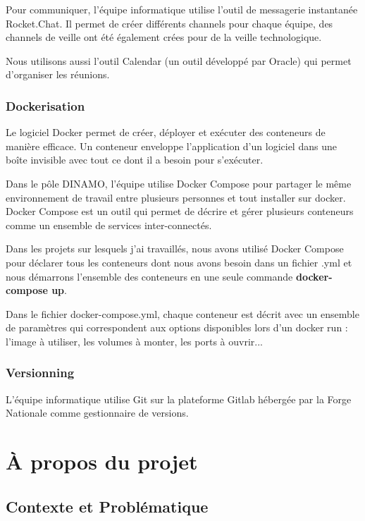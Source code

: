 \documentclass[12pt]{article}
\begin{document}
Pour communiquer, l'équipe informatique utilise l'outil de messagerie instantanée Rocket.Chat. Il permet de créer différents
channels pour chaque équipe, des channels de veille ont été également crées pour de la veille technologique.

Nous utilisons aussi l'outil Calendar (un outil développé par Oracle) qui permet d’organiser les réunions.  

\subsubsection{Dockerisation}

Le logiciel Docker permet de créer, déployer et exécuter des conteneurs de manière efficace. Un conteneur enveloppe l’application d’un logiciel dans une boîte invisible avec tout ce dont il a besoin pour s’exécuter.


Dans le pôle DINAMO, l'équipe utilise Docker Compose pour partager le même environnement de travail entre plusieurs personnes et tout installer sur docker. Docker Compose est un outil qui permet de décrire et gérer  plusieurs conteneurs comme un ensemble de services inter-connectés.

Dans les projets sur lesquels j'ai travaillés, nous avons utilisé Docker Compose pour déclarer tous les conteneurs dont nous avons besoin dans un fichier .yml  et nous démarrons l'ensemble des conteneurs en une seule commande \textbf{docker-compose up}. 

Dans le fichier docker-compose.yml, chaque conteneur est décrit avec un ensemble de paramètres qui correspondent aux options disponibles lors d’un docker run : l’image à utiliser, les volumes à monter, les ports à ouvrir...
 

\subsubsection{Versionning}

L'équipe informatique utilise Git sur la plateforme Gitlab hébergée par la Forge Nationale comme gestionnaire de versions. 

\section{À propos du projet}

\subsection{Contexte et Problématique}
\end{document}
